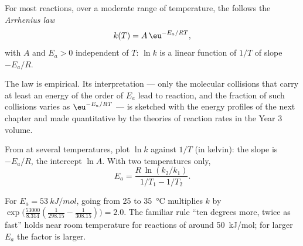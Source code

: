 \begin{theorem}\label{thm:b1:rate-laws:arrhenius}
For most reactions, over a moderate range of temperature, the  follows the \emph{Arrhenius law}
\[
  k(T) = A\,\eu^{-E_a/RT} ,
\]
with $A$ and $E_a > 0$ independent of $T$: $\ln k$ is a linear function of
$1/T$ of slope $-E_a/R$.
\end{theorem}
\admitted

\begin{remark}\label{rem:b1:rate-laws:meaning}
The law is empirical. Its interpretation --- only the molecular collisions
that carry at least an energy of the order of $E_a$ lead to reaction, and
the fraction of such collisions varies as $\eu^{-E_a/RT}$ --- is sketched
with the energy profiles of the next chapter and made quantitative by the
theories of reaction rates in the Year 3 volume.
\end{remark}

\begin{method}[Determining $E_a$]\label{met:b1:rate-laws:arrhenius-plot}
From  at several temperatures, plot $\ln k$ against $1/T$
(in kelvin): the slope is $-E_a/R$, the intercept $\ln A$. With two
temperatures only,
\[
  E_a = \frac{R\,\ln(k_2/k_1)}{1/T_1 - 1/T_2} .
\]
\end{method}

\begin{example}\label{ex:b1:rate-laws:doubling}
For $E_a = \qty{53}{kJ/mol}$, going from 25 to \qty{35}{\celsius}
multiplies $k$ by $\exp\!\big(\frac{53000}{8.314}(\frac{1}{298.15} -
\frac{1}{308.15})\big) = 2.0$. The familiar rule ``ten degrees more, twice
as fast'' holds near room temperature for reactions of 
around \qty{50}{kJ/mol}; for larger $E_a$ the factor is larger.
\end{example}

